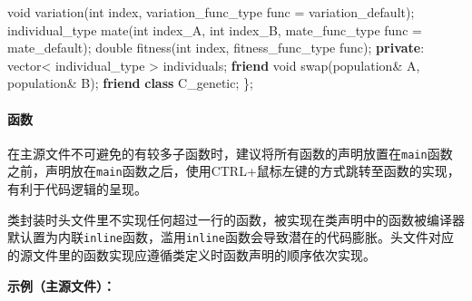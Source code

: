 \documentclass[
]{article}
\newenvironment{Shaded}{}{}
\newcommand{\DataTypeTok}[1]{\textcolor[rgb]{0.56,0.13,0.00}{#1}}
\newcommand{\KeywordTok}[1]{\textcolor[rgb]{0.00,0.44,0.13}{\textbf{#1}}}
\newcommand{\NormalTok}[1]{#1}
\newcommand{\OperatorTok}[1]{\textcolor[rgb]{0.40,0.40,0.40}{#1}}
\begin{document}
\begin{Shaded}
\begin{Highlighting}[]
	\DataTypeTok{void}\NormalTok{ variation}\OperatorTok{(}\DataTypeTok{int}\NormalTok{ index}\OperatorTok{,} \DataTypeTok{variation\_func\_type}\NormalTok{ func }\OperatorTok{=}\NormalTok{ variation\_default}\OperatorTok{);}
	\DataTypeTok{individual\_type}\NormalTok{ mate}\OperatorTok{(}\DataTypeTok{int}\NormalTok{ index\_A}\OperatorTok{,} \DataTypeTok{int}\NormalTok{ index\_B}\OperatorTok{,} \DataTypeTok{mate\_func\_type}\NormalTok{ func }\OperatorTok{=}\NormalTok{ mate\_default}\OperatorTok{);}
	\DataTypeTok{double}\NormalTok{ fitness}\OperatorTok{(}\DataTypeTok{int}\NormalTok{ index}\OperatorTok{,} \DataTypeTok{fitness\_func\_type}\NormalTok{ func}\OperatorTok{);}
\KeywordTok{private}\OperatorTok{:}
\NormalTok{	vector}\OperatorTok{\textless{}} \DataTypeTok{individual\_type} \OperatorTok{\textgreater{}}\NormalTok{ individuals}\OperatorTok{;}
	\KeywordTok{friend} \DataTypeTok{void}\NormalTok{ swap}\OperatorTok{(}\NormalTok{population}\OperatorTok{\&}\NormalTok{ A}\OperatorTok{,}\NormalTok{ population}\OperatorTok{\&}\NormalTok{ B}\OperatorTok{);}
	\KeywordTok{friend} \KeywordTok{class}\NormalTok{ C\_genetic}\OperatorTok{;}
\OperatorTok{\};}
\end{Highlighting}
\end{Shaded}

\hypertarget{ux51fdux6570}{%
\paragraph{函数}\label{ux51fdux6570}}

在主源文件不可避免的有较多子函数时，建议将所有函数的声明放置在\texttt{main}函数之前，声明放在\texttt{main}函数之后，使用CTRL+鼠标左键的方式跳转至函数的实现，有利于代码逻辑的呈现。

类封装时头文件里不实现任何超过一行的函数，被实现在类声明中的函数被编译器默认置为内联\texttt{inline}函数，滥用\texttt{inline}函数会导致潜在的代码膨胀。头文件对应的源文件里的函数实现应遵循类定义时函数声明的顺序依次实现。

\textbf{示例（主源文件）：}
\end{document}
